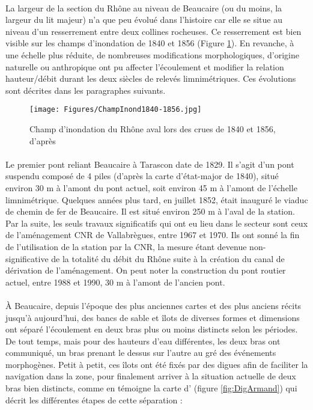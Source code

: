 \documentclass[11pt]{article}
\begin{document}
    \paragraph{} La largeur de la section du Rhône au niveau de Beaucaire (ou du moins, la largeur du lit majeur) n'a que peu évolué dans l'histoire car elle se situe au niveau d'un resserrement entre deux collines rocheuses. Ce resserrement est bien visible sur les champs d'inondation de 1840 et 1856 (Figure \ref{Champ1856}). En revanche, à une échelle plus réduite, de nombreuses modifications morphologiques, d'origine naturelle ou anthropique ont pu affecter l'écoulement et modifier la relation hauteur/débit durant les deux siècles de relevés limnimétriques. Ces évolutions sont décrites dans les paragraphes suivants.
        
    \begin{figure}[h]
        \centering
        \texttt{[image: Figures/ChampInond1840-1856.jpg]}
        \caption{Champ d'inondation du Rhône aval lors des crues de 1840 et 1856, d'après \citet{parde_regime_1925}}
        \label{Champ1856}
    \end{figure}
    

	\paragraph{} Le premier pont reliant Beaucaire à Tarascon date de 1829. Il s'agit d'un pont suspendu composé de 4 piles (d'après la carte d'état-major de 1840), situé environ 30 m à l'amont du pont actuel, soit environ 45 m à l'amont de l'échelle limnimétrique. Quelques années plus tard, en juillet 1852, était inauguré le viaduc de chemin de fer de Beaucaire. Il est situé environ 250 m à l'aval de la station. Par la suite, les seuls travaux significatifs qui ont eu lieu dans le secteur sont ceux de l'aménagement CNR de Vallabrègues, entre 1967 et 1970. Ils ont sonné la fin de l'utilisation de la station par la CNR, la mesure étant devenue non-significative de la totalité du débit du Rhône suite à la création du canal de dérivation de l'aménagement. On peut noter la construction du pont routier actuel, entre 1988 et 1990, 30 m à l'amont de l'ancien pont. 
        

        \paragraph{} À Beaucaire, depuis l'époque des plus anciennes cartes et des plus anciens récits jusqu'à aujourd'hui, des bancs de sable et îlots de diverses formes et dimensions ont séparé l'écoulement en deux bras plus ou moins distincts selon les périodes. De tout temps, mais pour des hauteurs d'eau différentes, les deux bras ont communiqué, un bras prenant le dessus sur l'autre au gré des événements morphogènes. Petit à petit, ces îlots ont été fixés par des digues afin de faciliter la navigation dans la zone, pour finalement arriver à la situation actuelle de deux bras bien distincts, comme en témoigne la carte d'\citet{armand_ii_1907} (figure \ref{fig:DigArmand}) qui décrit les différentes étapes de cette séparation :
        
\end{document}
